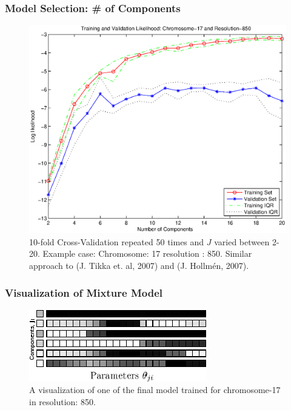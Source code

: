 \documentclass[dvips]{beamer}
\begin{document}
\begin{frame}[fragile]
  \frametitle{Model Selection: \# of Components}
\begin{figure}
\includegraphics[scale=0.3]{figures/chr17dm850}
\caption{10-fold Cross-Validation repeated 50 times and $J$ varied between 2-20. Example case: Chromosome: 17 resolution : 850. Similar approach to (J. Tikka et. al, 2007) and (J. Hollm\'en, 2007).}
\end{figure}
\end{frame}

\begin{frame}
\frametitle{Visualization of Mixture Model}
\begin{figure}
\includegraphics[scale =2.5]{figures/modelvis}
\caption{A visualization of one of the final model trained for chromosome-17 in resolution: 850.}
\end{figure}
\end{frame}
\end{document}

